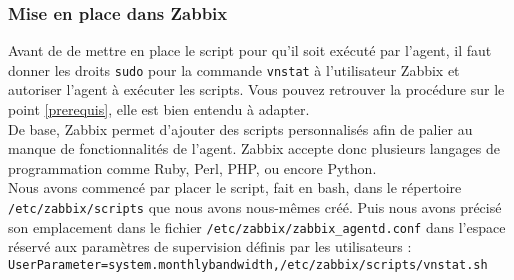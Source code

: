 				
		\subsubsection{Mise en place dans Zabbix}
			\vspace{0.3cm}

			Avant de de mettre en place le script pour qu'il soit exécuté par l'agent, il faut donner les droits \verb?sudo? pour la commande \verb?vnstat? à l'utilisateur Zabbix et autoriser l'agent à exécuter les scripts. Vous pouvez retrouver la procédure sur le point \ref{prerequis}, elle est bien entendu à adapter.\\

			De base, Zabbix permet d'ajouter des scripts personnalisés afin de palier au manque de fonctionnalités de l'agent. Zabbix accepte donc plusieurs langages de programmation comme Ruby, Perl, PHP, ou encore Python. \\

			Nous avons commencé par placer le script, fait en bash, dans le répertoire \verb?/etc/zabbix/scripts? que nous avons nous-mêmes créé. Puis nous avons précisé son emplacement dans le fichier \verb?/etc/zabbix/zabbix_agentd.conf? dans l'espace réservé aux paramètres de supervision définis par les utilisateurs : \verb?UserParameter=system.monthlybandwidth,/etc/zabbix/scripts/vnstat.sh?\\

